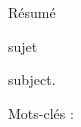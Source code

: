 \newpage
\thispagestyle{empty}
\begin{center}
Résumé
\end{center} 

\vspace{2em}
sujet


\vspace{2em}
subject.

\vspace{3em}
Mots-clés : 